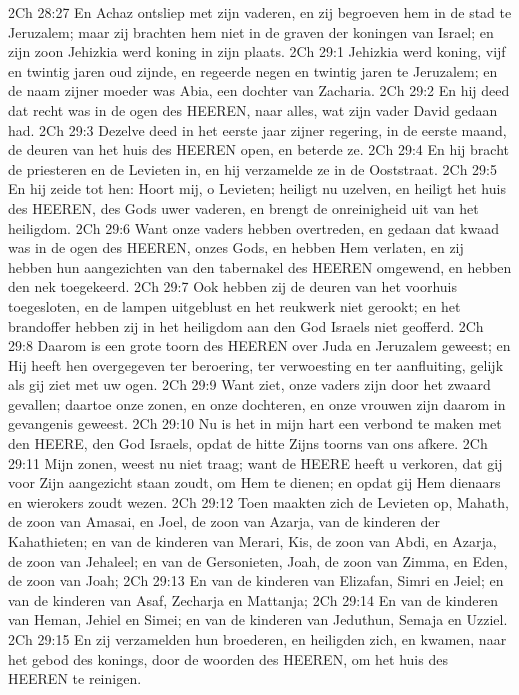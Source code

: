2Ch 28:27  En Achaz ontsliep met zijn vaderen, en zij begroeven hem in de stad te Jeruzalem; maar zij brachten hem niet in de graven der koningen van Israel; en zijn zoon Jehizkia werd koning in zijn plaats.
2Ch 29:1  Jehizkia werd koning, vijf en twintig jaren oud zijnde, en regeerde negen en twintig jaren te Jeruzalem; en de naam zijner moeder was Abia, een dochter van Zacharia.
2Ch 29:2  En hij deed dat recht was in de ogen des HEEREN, naar alles, wat zijn vader David gedaan had.
2Ch 29:3  Dezelve deed in het eerste jaar zijner regering, in de eerste maand, de deuren van het huis des HEEREN open, en beterde ze.
2Ch 29:4  En hij bracht de priesteren en de Levieten in, en hij verzamelde ze in de Ooststraat.
2Ch 29:5  En hij zeide tot hen: Hoort mij, o Levieten; heiligt nu uzelven, en heiligt het huis des HEEREN, des Gods uwer vaderen, en brengt de onreinigheid uit van het heiligdom.
2Ch 29:6  Want onze vaders hebben overtreden, en gedaan dat kwaad was in de ogen des HEEREN, onzes Gods, en hebben Hem verlaten, en zij hebben hun aangezichten van den tabernakel des HEEREN omgewend, en hebben den nek toegekeerd.
2Ch 29:7  Ook hebben zij de deuren van het voorhuis toegesloten, en de lampen uitgeblust en het reukwerk niet gerookt; en het brandoffer hebben zij in het heiligdom aan den God Israels niet geofferd.
2Ch 29:8  Daarom is een grote toorn des HEEREN over Juda en Jeruzalem geweest; en Hij heeft hen overgegeven ter beroering, ter verwoesting en ter aanfluiting, gelijk als gij ziet met uw ogen.
2Ch 29:9  Want ziet, onze vaders zijn door het zwaard gevallen; daartoe onze zonen, en onze dochteren, en onze vrouwen zijn daarom in gevangenis geweest.
2Ch 29:10  Nu is het in mijn hart een verbond te maken met den HEERE, den God Israels, opdat de hitte Zijns toorns van ons afkere.
2Ch 29:11  Mijn zonen, weest nu niet traag; want de HEERE heeft u verkoren, dat gij voor Zijn aangezicht staan zoudt, om Hem te dienen; en opdat gij Hem dienaars en wierokers zoudt wezen.
2Ch 29:12  Toen maakten zich de Levieten op, Mahath, de zoon van Amasai, en Joel, de zoon van Azarja, van de kinderen der Kahathieten; en van de kinderen van Merari, Kis, de zoon van Abdi, en Azarja, de zoon van Jehaleel; en van de Gersonieten, Joah, de zoon van Zimma, en Eden, de zoon van Joah;
2Ch 29:13  En van de kinderen van Elizafan, Simri en Jeiel; en van de kinderen van Asaf, Zecharja en Mattanja;
2Ch 29:14  En van de kinderen van Heman, Jehiel en Simei; en van de kinderen van Jeduthun, Semaja en Uzziel.
2Ch 29:15  En zij verzamelden hun broederen, en heiligden zich, en kwamen, naar het gebod des konings, door de woorden des HEEREN, om het huis des HEEREN te reinigen.
